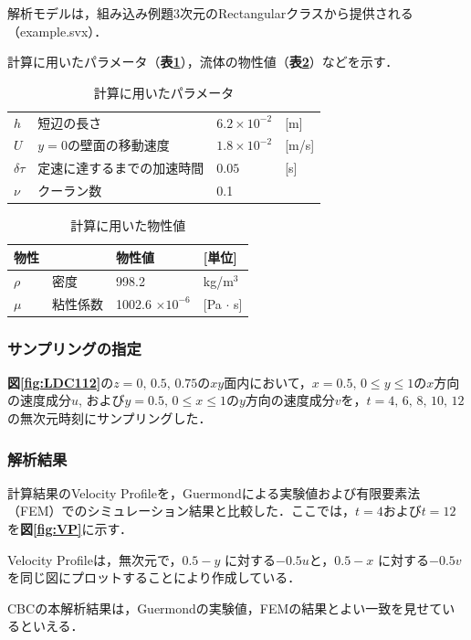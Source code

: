 解析モデルは，組み込み例題3次元のRectangularクラスから提供される（example.svx）．

計算に用いたパラメータ（\textbf{表\ref{Table.paramLDC}}），流体の物性値（\textbf{表\ref{Table.busseiLDC}}）などを示す．
\begin{table}[htbp]
\centering
\caption{計算に用いたパラメータ}
\label{Table.paramLDC}
\begin{tabular}{llll}\toprule
$h$ &短辺の長さ &$6.2\times10^{-2}$ &[m]\\
$U$ &$y=0$の壁面の移動速度 & $1.8\times10^{-2}$ &[m/s]\\
$\delta \tau $& 定速に達するまでの加速時間&$0.05$ &[s]\\
$\nu $ & クーラン数 & 0.1 & \\
\bottomrule
\end{tabular}
\end{table}

\begin{table}[htbp]
\centering
\caption{計算に用いた物性値}
\label{Table.busseiLDC}
\begin{tabular}{llll}\toprule
物性 &&物性値  & [単位]\\
\midrule
$\rho$ & 密度 & 998.2 & kg/m$^3$\\
$\mu$  & 粘性係数 & 1002.6 $\times 10^{-6}$ &[Pa $\cdot$ s]\\
\bottomrule
\end{tabular}
\end{table}

\subsubsection{サンプリングの指定}
\textbf{図\ref{fig:LDC112}}の$z=0, \, 0.5, \, 0.75$の$xy$面内において，$x=0.5, \, 0 \leq y \leq 1$の$x$方向の速度成分$u$, および$y=0.5, \, 0 \leq x \leq 1$の$y$方向の速度成分$v$を，$t=4, \, 6, \, 8, \, 10, \, 12$の無次元時刻にサンプリングした．

\subsubsection{解析結果}
計算結果のVelocity Profileを，Guermondによる実験値および有限要素法（FEM）でのシミュレーション結果と比較した．ここでは，$t=4$および$t=12$を\textbf{図\ref{fig:VP}}に示す．

Velocity Profileは，無次元で，$0.5-y$ に対する$ -0.5u$と，$0.5-x$ に対する$-0.5v$を同じ図にプロットすることにより作成している．

CBCの本解析結果は，Guermondの実験値，FEMの結果とよい一致を見せているといえる．

